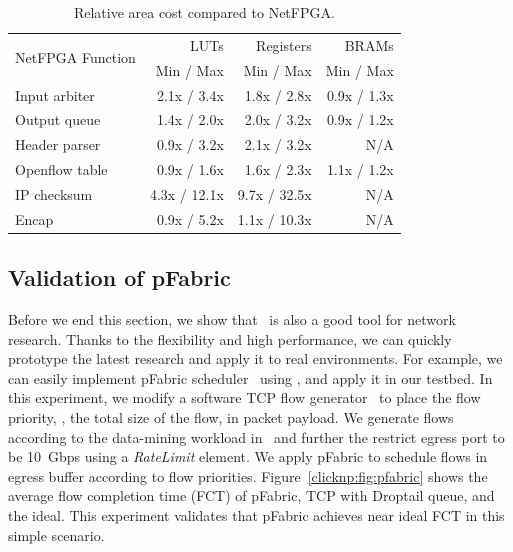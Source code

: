 \begin{table}[t!]
	\centering
	
	\caption{Relative area cost compared to NetFPGA.}
	\label{clicknp:tab:netfpga}
		\begin{tabular}{l|r|r|r}
			\toprule
			\multirow{2}{2.2cm}{NetFPGA Function} & LUTs & Registers & BRAMs \\
						& Min / Max & Min / Max & Min / Max \\
			\midrule
			Input arbiter  & 2.1x / 3.4x & 1.8x / 2.8x & 0.9x / 1.3x \\
			Output queue   & 1.4x / 2.0x & 2.0x / 3.2x & 0.9x / 1.2x \\
			Header parser  & 0.9x / 3.2x & 2.1x / 3.2x & N/A \\
			Openflow table & 0.9x / 1.6x & 1.6x / 2.3x & 1.1x / 1.2x \\
			\midrule
			\midrule
			IP checksum    & 4.3x / 12.1x & 9.7x / 32.5x & N/A \\
			Encap          & 0.9x / 5.2x & 1.1x / 10.3x & N/A \\
			\bottomrule
		\end{tabular}

\end{table}


\subsection{Validation of pFabric}
Before we end this section, we show that \name\ is also a good tool for network research.
Thanks to the flexibility and high performance, we can quickly prototype the latest research 
and apply it to real environments.
For example, we can easily implement pFabric scheduler~\cite{pfabric} using \name, and 
apply it in our testbed.
%
In this experiment, we modify a software TCP flow generator~\cite{mqecn} to place the flow
priority, \ie, the total size of the flow, in packet payload.
We generate flows according to the data-mining workload in~\cite{pfabric} and further
the restrict egress port to be 10~Gbps using a \textit{RateLimit} element.
We apply pFabric to schedule flows in egress buffer according to flow priorities. 
Figure~\ref{clicknp:fig:pfabric} shows the average flow completion time (FCT) of pFabric, TCP with Droptail queue, and the ideal.
This experiment validates that pFabric achieves near ideal FCT in this simple scenario.

